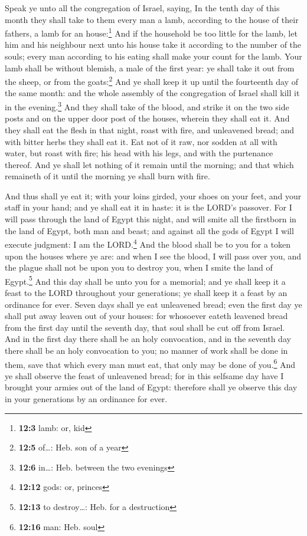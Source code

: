  Speak ye unto all the congregation of Israel, saying, In
the tenth day of this month they shall take to them every man a lamb,
according to the house of their fathers, a lamb for an house:\footnote{\textbf{12:3}
  lamb: or, kid}  And if the household be too little for
the lamb, let him and his neighbour next unto his house take it
according to the number of the souls; every man according to his eating
shall make your count for the lamb.  Your lamb shall be
without blemish, a male of the first year: ye shall take it out from the
sheep, or from the goats:\footnote{\textbf{12:5} of\ldots: Heb. son of a
  year}  And ye shall keep it up until the fourteenth day
of the same month: and the whole assembly of the congregation of Israel
shall kill it in the evening.\footnote{\textbf{12:6} in\ldots: Heb.
  between the two evenings}  And they shall take of the
blood, and strike it on the two side posts and on the upper door post of
the houses, wherein they shall eat it.  And they shall eat
the flesh in that night, roast with fire, and unleavened bread; and with
bitter herbs they shall eat it.  Eat not of it raw, nor
sodden at all with water, but roast with fire; his head with his legs,
and with the purtenance thereof.  And ye shall let
nothing of it remain until the morning; and that which remaineth of it
until the morning ye shall burn with fire.

 And thus shall ye eat it; with your loins girded, your
shoes on your feet, and your staff in your hand; and ye shall eat it in
haste: it is the LORD's passover.  For I will pass
through the land of Egypt this night, and will smite all the firstborn
in the land of Egypt, both man and beast; and against all the gods of
Egypt I will execute judgment: I am the LORD.\footnote{\textbf{12:12}
  gods: or, princes}  And the blood shall be to you for a
token upon the houses where ye are: and when I see the blood, I will
pass over you, and the plague shall not be upon you to destroy you, when
I smite the land of Egypt.\footnote{\textbf{12:13} to destroy\ldots:
  Heb. for a destruction}  And this day shall be unto you
for a memorial; and ye shall keep it a feast to the LORD throughout your
generations; ye shall keep it a feast by an ordinance for ever.
 Seven days shall ye eat unleavened bread; even the first
day ye shall put away leaven out of your houses: for whosoever eateth
leavened bread from the first day until the seventh day, that soul shall
be cut off from Israel.  And in the first day there shall
be an holy convocation, and in the seventh day there shall be an holy
convocation to you; no manner of work shall be done in them, save that
which every man must eat, that only may be done of you.\footnote{\textbf{12:16}
  man: Heb. soul}  And ye shall observe the feast of
unleavened bread; for in this selfsame day have I brought your armies
out of the land of Egypt: therefore shall ye observe this day in your
generations by an ordinance for ever.

